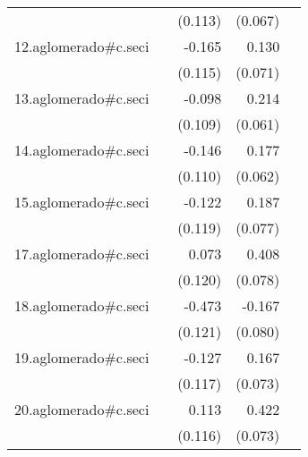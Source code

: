 {\begin{longtable}{l*{4}{D{.}{.}{-1}}}
            &                     &     (0.113)         &     (0.067)         &                     \\
\addlinespace
12.aglomerado#c.seci&                     &      -0.165         &       0.130         &                     \\
            &                     &     (0.115)         &     (0.071)         &                     \\
\addlinespace
13.aglomerado#c.seci&                     &      -0.098         &       0.214\sym{***}&                     \\
            &                     &     (0.109)         &     (0.061)         &                     \\
\addlinespace
14.aglomerado#c.seci&                     &      -0.146         &       0.177\sym{**} &                     \\
            &                     &     (0.110)         &     (0.062)         &                     \\
\addlinespace
15.aglomerado#c.seci&                     &      -0.122         &       0.187\sym{*}  &                     \\
            &                     &     (0.119)         &     (0.077)         &                     \\
\addlinespace
17.aglomerado#c.seci&                     &       0.073         &       0.408\sym{***}&                     \\
            &                     &     (0.120)         &     (0.078)         &                     \\
\addlinespace
18.aglomerado#c.seci&                     &      -0.473\sym{***}&      -0.167\sym{*}  &                     \\
            &                     &     (0.121)         &     (0.080)         &                     \\
\addlinespace
19.aglomerado#c.seci&                     &      -0.127         &       0.167\sym{*}  &                     \\
            &                     &     (0.117)         &     (0.073)         &                     \\
\addlinespace
20.aglomerado#c.seci&                     &       0.113         &       0.422\sym{***}&                     \\
            &                     &     (0.116)         &     (0.073)         &                     \\

\end{longtable}}

